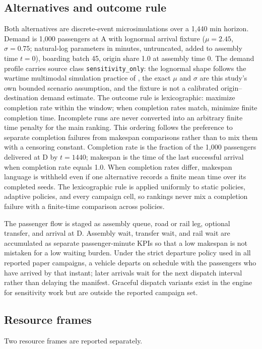 \documentclass{ieeeaccess}
\begin{document}
\subsection{Alternatives and outcome rule}
Both alternatives are discrete-event microsimulations over a 1{,}440 min horizon. Demand is 1{,}000 passengers at A with lognormal arrival fixture ($\mu=2.45$, $\sigma=0.75$; natural-log parameters in minutes, untruncated, added to assembly time $t=0$), boarding batch 45, origin share 1.0 at assembly time 0. The demand profile carries source class \texttt{sensitivity\_\allowbreak only}: the lognormal shape follows the wartime multimodal simulation practice of \cite{b1}, the exact $\mu$ and $\sigma$ are this study's own bounded scenario assumption, and the fixture is not a calibrated origin--destination demand estimate. The outcome rule is lexicographic: maximize completion rate within the window; when completion rates match, minimize finite completion time. Incomplete runs are never converted into an arbitrary finite time penalty for the main ranking. This ordering follows the preference to separate completion failures from makespan comparisons rather than to mix them with a censoring constant. Completion rate is the fraction of the 1{,}000 passengers delivered at D by $t=1440$; makespan is the time of the last successful arrival when completion rate equals 1.0. When completion rates differ, makespan language is withheld even if one alternative records a finite mean time over its completed seeds. The lexicographic rule is applied uniformly to static policies, adaptive policies, and every campaign cell, so rankings never mix a completion failure with a finite-time comparison across policies.

The passenger flow is staged as assembly queue, road or rail leg, optional transfer, and arrival at D. Assembly wait, transfer wait, and rail wait are accumulated as separate passenger-minute KPIs so that a low makespan is not mistaken for a low waiting burden. Under the strict departure policy used in all reported paper campaigns, a vehicle departs on schedule with the passengers who have arrived by that instant; later arrivals wait for the next dispatch interval rather than delaying the manifest. Graceful dispatch variants exist in the engine for sensitivity work but are outside the reported campaign set.

\subsection{Resource frames}
Two resource frames are reported separately.
\end{document}
